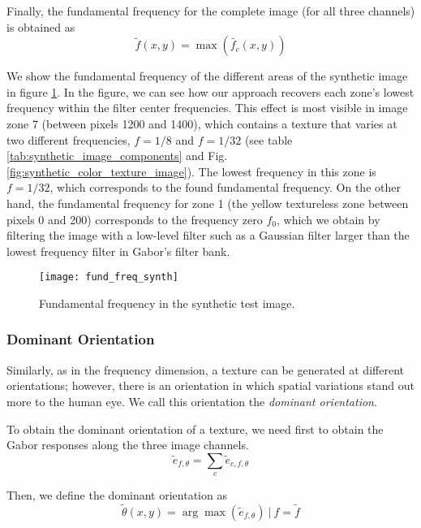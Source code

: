 Finally, the fundamental frequency for the complete image (for all three channels) is obtained as
\begin{equation}
	\widetilde{f}(x,y) =  \max(\widetilde{f_c}(x,y))  \label{eq:fundamental_freq}
\end{equation}

We show the fundamental frequency of the different areas of the synthetic image in figure \ref{fig:fund_freq_synth}. In the figure, we can see how our approach recovers each zone's lowest frequency within the filter center frequencies. This effect is most visible in image zone 7 (between pixels 1200 and 1400), which contains a texture that varies at two different frequencies, $f = 1/8$ and $f = 1/32$ (see table \ref{tab:synthetic_image_components} and Fig. \ref{fig:synthetic_color_texture_image}). The lowest frequency in this zone is $f = 1/32$, which corresponds to the found fundamental frequency. On the other hand, the fundamental frequency for zone 1 (the yellow textureless zone between pixels 0 and 200) corresponds to the frequency zero $f_0$, which we obtain by filtering the image with a low-level filter such as a Gaussian filter larger than the lowest frequency filter in Gabor's filter bank.

\begin{figure}[!ht]
	\texttt{[image: fund\_freq\_synth]}
    \caption{Fundamental frequency in the synthetic test image.}
    \label{fig:fund_freq_synth}
\end{figure}

\subsubsection{Dominant Orientation}
Similarly, as in the frequency dimension, a texture can be generated at different orientations; however, there is an orientation in which spatial variations stand out more to the human eye. We call this orientation the \textit{dominant orientation}.

To obtain the dominant orientation of a texture, we need first to obtain the Gabor responses along the three image channels.
\begin{equation}
	\widetilde{e}_{f, \theta} = \underset{c}{\sum} \widetilde{e}_{c, f, \theta}  \label{eq:gabor_energy_freq_orient}
\end{equation}

Then, we define the dominant orientation as 
\begin{equation}
	\widetilde{\theta}(x,y) =  \arg\max (\widetilde{e}_{f, \theta}) ~|~ f = \widetilde{f} \label{eq:dominant_orient}
\end{equation}


